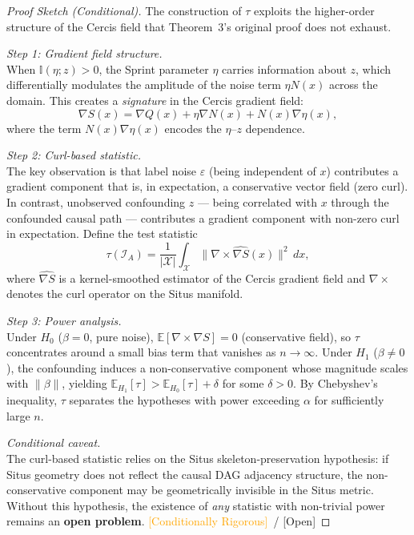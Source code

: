 \documentclass[12pt,a4paper]{article}
\newcommand{\conditionallyrigorous}{\textcolor{orange}{\small\textsf{[Conditionally Rigorous]}}}
\newcommand{\openquest}{\textcolor{red!70!black}{\small\textsf{[Open]}}}
\newcommand{\E}{\mathbb{E}}
\newcommand{\I}{\mathbb{I}}
\newcommand{\cX}{\mathcal{X}}
\newcommand{\cI}{\mathcal{I}}
\begin{document}
\begin{proof}[Proof Sketch (Conditional)]
The construction of $\tau$ exploits the higher-order structure of the Cercis
field that Theorem~3's original proof does not exhaust.

\textit{Step 1: Gradient field structure.}\\
When $\I(\eta; z) > 0$, the Sprint parameter $\eta$ carries information about
$z$, which differentially modulates the amplitude of the noise term
$\eta N(x)$ across the domain.  This creates a \emph{signature} in the Cercis
gradient field:
\begin{equation}\label{eq:grad-signature}
    \nabla S(x) = \nabla Q(x) + \eta \nabla N(x) + N(x) \nabla \eta(x),
\end{equation}
where the term $N(x) \nabla \eta(x)$ encodes the $\eta$--$z$ dependence.

\textit{Step 2: Curl-based statistic.}\\
The key observation is that label noise $\varepsilon$ (being independent of
$x$) contributes a gradient component that is, in expectation, a conservative
vector field (zero curl).  In contrast, unobserved confounding $z$ — being
correlated with $x$ through the confounded causal path — contributes a gradient
component with non-zero curl in expectation.  Define the test statistic
\begin{equation}\label{eq:tau}
    \tau(\cI_A) = \frac{1}{|\cX|}\int_{\cX}
    \big\|\nabla \times \widehat{\nabla S}(x)\big\|^2 \,dx,
\end{equation}
where $\widehat{\nabla S}$ is a kernel-smoothed estimator of the Cercis
gradient field and $\nabla \times$ denotes the curl operator on the Situs
manifold.

\textit{Step 3: Power analysis.}\\
Under $H_0$ ($\beta = 0$, pure noise), $\E[\nabla \times \nabla S] = 0$
(conservative field), so $\tau$ concentrates around a small bias term that
vanishes as $n \to \infty$.  Under $H_1$ ($\beta \neq 0$), the confounding
induces a non-conservative component whose magnitude scales with $\|\beta\|$,
yielding $\E_{H_1}[\tau] > \E_{H_0}[\tau] + \delta$ for some $\delta > 0$.
By Chebyshev's inequality, $\tau$ separates the hypotheses with power
exceeding $\alpha$ for sufficiently large $n$.

\textit{Conditional caveat.}\\
The curl-based statistic relies on the Situs skeleton-preservation hypothesis:
if Situs geometry does not reflect the causal DAG adjacency structure, the
non-conservative component may be geometrically invisible in the Situs metric.
Without this hypothesis, the existence of \emph{any} statistic with non-trivial
power remains an \textbf{open problem}.  \conditionallyrigorous~/
\openquest
\end{proof}
\end{document}
